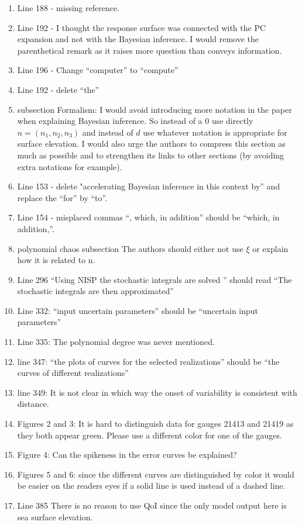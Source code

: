 \documentclass[]{article}
\begin{document}
\begin{enumerate}
\item Line 188 - missing reference.
\item Line 192 - I thought the response surface was connected with the PC expansion and not with the Bayesian inference. I would remove the parenthetical remark as it raises more question than conveys information.
\item Line 196 - Change ``computer'' to ``compute''
\item Line 192 - delete ``the''
\item subsection Formalism: I would avoid introducing more notation in the paper when explaining Bayesian inference. So instead of a 0 use directly $n = (n_1 , n_2 , n_3 )$ and instead of $d$ use whatever notation is appropriate for surface elevation. I would also urge the authors to compress this section as much as possible and to strengthen its links to other sections (by avoiding extra notations for example).
\item Line 153 - delete "accelerating Bayesian inference in this context by” and replace the ``for'' by ``to''.
\item Line 154 - misplaced commas ``, which, in addition'' should be ``which, in addition,''.
\item polynomial chaos subsection The authors should either not use $\xi$ or explain how it is related to n.
\item Line 296 ``Using NISP the stochastic integrals are solved '' should read ``The stochastic integrals are then approximated''
\item Line 332: ``input uncertain parameters'' should be ``uncertain input parameters''
\item Line 335: The polynomial degree was never mentioned.
\item line 347: ``the plots of curves for the selected realizations'' should be ``the curves of different realizations''
\item line 349: It is not clear in which way the onset of variability is consistent with distance.
\item Figures 2 and 3: It is hard to distinguish data for gauges 21413 and 21419 as they both appear green.
Please use a different color for one of the gauges.
\item Figure 4: Can the spikeness in the error curves be explained?
\item Figures 5 and 6: since the different curves are distinguished by color it would be easier on the readers
eyes if a solid line is used instead of a dashed line.
\item Line 385 There is no reason to use QoI since the only model output here is sea surface elevation.

\end{enumerate}
\end{document}
